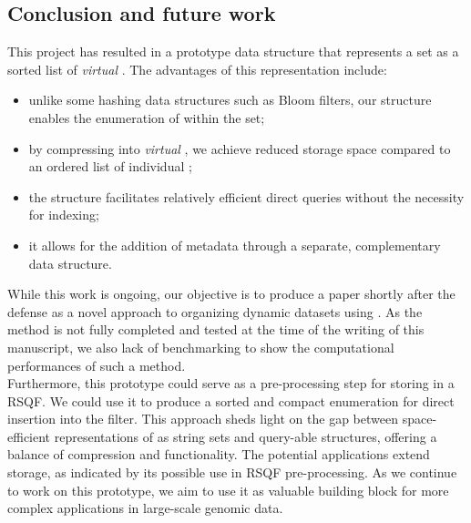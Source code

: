 \subsection{Conclusion and future work}
This project has resulted in a prototype data structure that represents a \kmer set as a sorted list of \emph{virtual} \skmers. The advantages of this representation include:
\begin{itemize}
	\item unlike some hashing data structures such as Bloom filters, our structure enables the enumeration of \kmers within the set;
	\item by compressing \kmers into \emph{virtual} \skmers, we achieve reduced storage space compared to an ordered list of individual \kmers;
	\item the structure facilitates relatively efficient direct queries without the necessity for indexing;
	\item it allows for the addition of metadata through a separate, complementary data structure.
\end{itemize}
While this work is ongoing, our objective is to produce a paper shortly after the defense as a novel approach to organizing dynamic datasets using \kmers. As the method is not fully completed and tested at the time of the writing of this manuscript, we also lack of benchmarking to show the computational performances of such a method.\\
Furthermore, this prototype could serve as a pre-processing step for storing \kmers in a RSQF. We could use it to produce a sorted and compact \kmer enumeration for direct insertion into the filter.
This approach sheds light on the gap between space-efficient representations of \kmers as string sets and query-able structures, offering a balance of compression and functionality. The potential applications extend storage, as indicated by its possible use in RSQF pre-processing. As we continue to work on this prototype, we aim to use it as valuable building block for more complex applications in large-scale genomic data.

